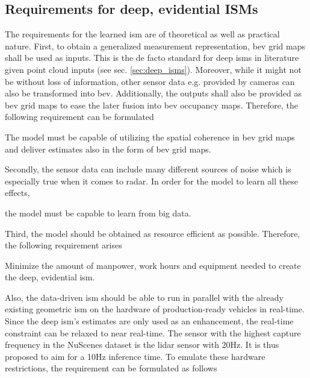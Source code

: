 \subsection{Requirements for deep, evidential ISMs}
\label{subsec:requirements_for_ev_representation}
The requirements for the learned \gls{ism} are of theoretical as well as practical nature. First, to obtain a generalized measurement representation, \gls{bev} grid maps shall be used as inputs. This is the de facto standard for deep \gls{ism}s in literature given point cloud inputs (see sec. \ref{sec:deep_isms}). Moreover, while it might not be without loss of information, other sensor data e.g. provided by cameras can also be transformed into \gls{bev}. Additionally, the outputs shall also be provided as \gls{bev} grid maps to ease the later fusion into \gls{bev} occupancy maps. Therefore, the following requirement can be formulated 
\\
\setcounter{req}{1}
\setcounter{subreq}{0}
\begin{subreq} \label{subreq:input_output}
	The model must be capable of utilizing the spatial coherence in \gls{bev} grid maps and deliver estimates also in the form of \gls{bev} grid maps.
\end{subreq}
Secondly, the sensor data can include many different sources of noise which is especially true when it comes to radar. In order for the model to learn all these effects, 
\\
\begin{subreq} \label{subreq:big_data}
	the model must be capable to learn from big data.
\end{subreq}
Third, the model should be obtained as resource efficient as possible. Therefore, the following requirement arises
\\
\begin{subreq} \label{subreq:min_requirements}
	Minimize the amount of manpower, work hours and equipment needed to create the deep, evidential \gls{ism}.
\end{subreq}
Also, the data-driven \gls{ism} should be able to run in parallel with the already existing geometric \gls{ism} on the hardware of production-ready vehicles in real-time. Since the deep \gls{ism}'s estimates are only used as an enhancement, the real-time constraint can be relaxed to near real-time. The sensor with the highest capture frequency in the NuScenes dataset is the lidar sensor with 20Hz. It is thus proposed to aim for a 10Hz inference time. To emulate these hardware restrictions, the requirement can be formulated as follows
